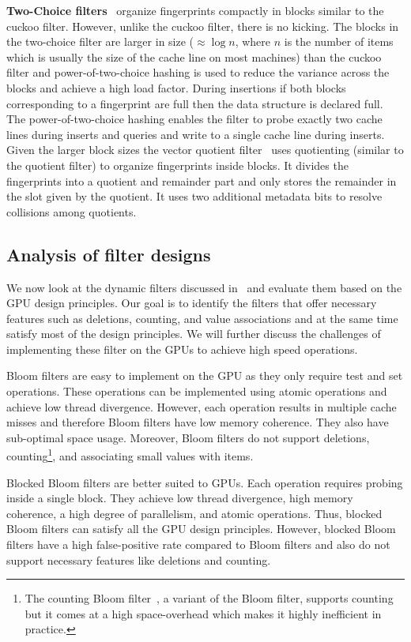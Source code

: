 \textbf{Two-Choice filters}~\cite{pandeySigmod21} organize fingerprints
compactly in blocks similar to the cuckoo filter. However, unlike the cuckoo
filter, there is no kicking. The blocks in the two-choice filter are larger in
size ($\approx \log{n}$, where $n$ is the number of items which is usually the
size of the cache line on most machines) than the cuckoo filter and
power-of-two-choice hashing is used to reduce the variance across the blocks and
achieve a high load factor. During insertions if both blocks corresponding to a
fingerprint are full then the data structure is declared full. The
power-of-two-choice hashing enables the filter to probe exactly two cache lines
during inserts and queries and write to a single cache line during inserts.
Given the larger block sizes the vector quotient filter~\cite{pandeySigmod21}
uses quotienting (similar to the quotient filter) to organize fingerprints
inside blocks. It divides the fingerprints into a quotient and remainder part
and only stores the remainder in the slot given by the quotient. It uses two
additional metadata bits to resolve collisions among quotients.


\subsection{Analysis of filter designs}

We now look at the dynamic filters discussed in~ and evaluate
them based on the GPU design principles.  Our goal is to identify the filters
that offer necessary features such as deletions, counting, and value
associations and at the same time satisfy most of the design principles.  We
will further discuss the challenges of implementing these filter on the GPUs to
achieve high speed operations.

Bloom filters are easy to implement on the GPU as they only require test and set
operations. These operations can be implemented using atomic operations and
achieve low thread divergence. However, each operation results in multiple cache
misses and therefore Bloom filters have low memory coherence. They also have
sub-optimal space usage. Moreover, Bloom filters do not support deletions,
counting\footnote{The counting Bloom filter~\cite{FanCaAl00}, a variant of the
Bloom filter, supports counting but it comes at a high space-overhead which
makes it highly inefficient in practice.}, and associating small values with
items.

Blocked Bloom filters are better suited to GPUs.  Each operation requires
probing inside a single block. They achieve low thread divergence, high memory
coherence, a high degree of parallelism, and atomic operations. Thus, blocked
Bloom filters can satisfy all the GPU design principles. However, blocked Bloom
filters have a high false-positive rate compared to Bloom filters and also do
not support necessary features like deletions and counting.

